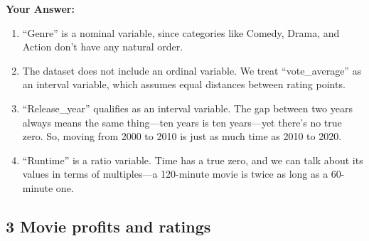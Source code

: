 \documentclass[
]{article}
\newenvironment{Shaded}{\begin{snugshade}}{\end{snugshade}}
\newcommand{\DocumentationTok}[1]{\textcolor[rgb]{0.56,0.35,0.01}{\textbf{\textit{#1}}}}
\newcommand{\FunctionTok}[1]{\textcolor[rgb]{0.13,0.29,0.53}{\textbf{#1}}}
\newcommand{\NormalTok}[1]{#1}
\newcommand{\SpecialCharTok}[1]{\textcolor[rgb]{0.81,0.36,0.00}{\textbf{#1}}}
\begin{document}
\begin{Shaded}
\end{Shaded}

\textbf{Your Answer:}

\begin{enumerate}
\def\labelenumi{(\roman{enumi})}
\item
  ``Genre'' is a nominal variable, since categories like Comedy, Drama,
  and Action don't have any natural order.
\item
  The dataset does not include an ordinal variable. We treat
  ``vote\_average'' as an interval variable, which assumes equal
  distances between rating points.
\item
  ``Release\_year'' qualifies as an interval variable. The gap between
  two years always means the same thing---ten years is ten years---yet
  there's no true zero. So, moving from 2000 to 2010 is just as much
  time as 2010 to 2020.
\item
  ``Runtime'' is a ratio variable. Time has a true zero, and we can talk
  about its values in terms of multiples---a 120-minute movie is twice
  as long as a 60-minute one.
\end{enumerate}

\subsection{3 Movie profits and
ratings}\label{movie-profits-and-ratings}
\end{document}
